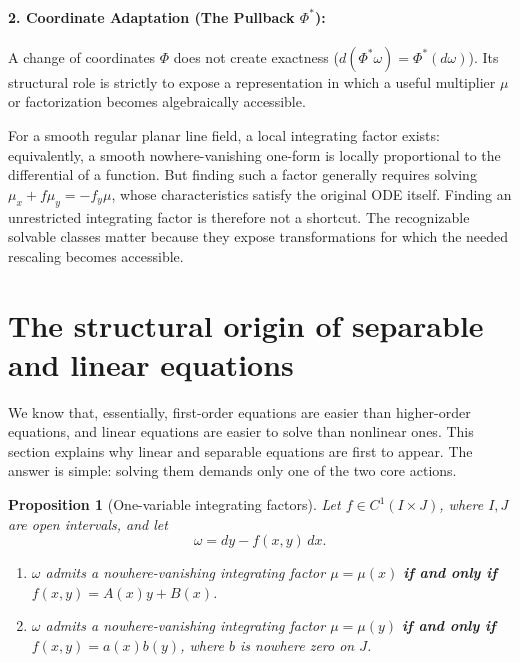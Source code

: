 \documentclass[11pt]{article}
\newtheorem{proposition}{Proposition}
\theoremstyle{definition}
\begin{document}
\paragraph{2. Coordinate Adaptation (The Pullback \(\Phi^*\)):}
A change of coordinates \(\Phi\) does not create exactness (\(d(\Phi^*\omega)=\Phi^*(d\omega)\)). Its structural role is strictly to expose a representation in which a useful multiplier \(\mu\) or factorization becomes algebraically accessible. 

For a smooth regular planar line field, a local integrating factor exists: equivalently, a smooth nowhere-vanishing one-form is locally proportional to the differential of a function. But finding such a factor generally requires solving \(\mu_x+f\mu_y=-f_y\mu\), whose characteristics satisfy the original ODE itself. Finding an unrestricted integrating factor is therefore not a shortcut. The recognizable solvable classes matter because they expose transformations for which the needed rescaling becomes accessible.

\section{The structural origin of separable and linear equations}

We know that, essentially, first-order equations are easier than higher-order equations, and linear equations are easier to solve than nonlinear ones. This section explains why linear and separable equations are first to appear. The answer is simple: solving them demands only one of the two core actions. 

\begin{proposition}[One-variable integrating factors]\label{prop:factors}
Let \(f\in C^1(I\times J)\), where \(I,J\) are open intervals, and let
\[
\omega=dy-f(x,y)\,dx.
\]
\begin{enumerate}
\renewcommand{\labelenumi}{(\roman{enumi})}
\item \(\omega\) admits a nowhere-vanishing integrating factor \(\mu=\mu(x)\) \textbf{if and only if} \(f(x,y)=A(x)y+B(x)\).
\item \(\omega\) admits a nowhere-vanishing integrating factor \(\mu=\mu(y)\) \textbf{if and only if} \(f(x,y)=a(x)b(y)\), where \(b\) is nowhere zero on \(J\).
\end{enumerate}
\end{proposition}
\end{document}
